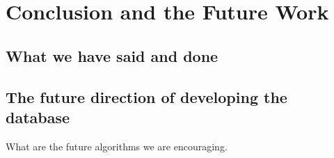 \section{Conclusion and the Future Work}
\label{sec:summ}
\subsection{What we have said and done}
\subsection{The future direction of developing the database}
What are the future algorithms we are encouraging.

	
